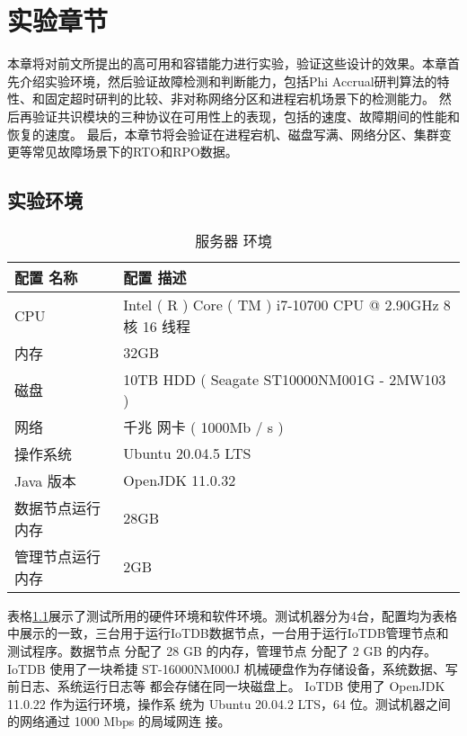 
\chapter{实验章节}

本章将对前文所提出的高可用和容错能力进行实验，验证这些设计的效果。本章首先介绍实验环境，然后验证故障检测和判断能力，包括Phi Accrual研判算法的特性、和固定超时研判的比较、非对称网络分区和进程宕机场景下的检测能力。
然后再验证共识模块的三种协议在可用性上的表现，包括\failover 的速度、故障期间的性能和恢复的速度。
最后，本章节将会验证在进程宕机、磁盘写满、网络分区、集群变更等常见故障场景下的RTO和RPO数据。


\section{实验环境}


\begin{table}[h!]
    \centering
    \caption{服务器 环境}
    \label{tab:server_environment}
    \begin{tabular}{ll}
        \toprule
        配置 名称 & 配置 描述 \\
        \midrule
        CPU & Intel ( R ) Core ( TM ) i7-10700 CPU @ 2.90GHz 8 核 16 线程 \\
        内存 & 32GB \\
        磁盘 & 10TB HDD ( Seagate ST10000NM001G - 2MW103 ) \\
        网络 & 千兆 网卡 ( 1000Mb / s ) \\
        操作系统 & Ubuntu 20.04.5 LTS \\
        Java 版本 & OpenJDK 11.0.32 \\
       数据节点运行内存 & 28GB \\
       管理节点运行内存 & 2GB \\
        \bottomrule
    \end{tabular}
\end{table}

表格\ref{tab:server_environment}展示了测试所用的硬件环境和软件环境。测试机器分为4台，配置均为表格中展示的一致，三台用于运行IoTDB数据节点，一台用于运行IoTDB管理节点和测试程序。数据节点
分配了 28 GB 的内存，管理节点 分配了 2 GB 的内存。IoTDB 使用了一块希捷
ST-16000NM000J 机械硬盘作为存储设备，系统数据、写前日志、系统运行日志等
都会存储在同一块磁盘上。 IoTDB 使用了 OpenJDK 11.0.22 作为运行环境，操作系
统为 Ubuntu 20.04.2 LTS，64 位。测试机器之间的网络通过 1000 Mbps 的局域网连
接。

